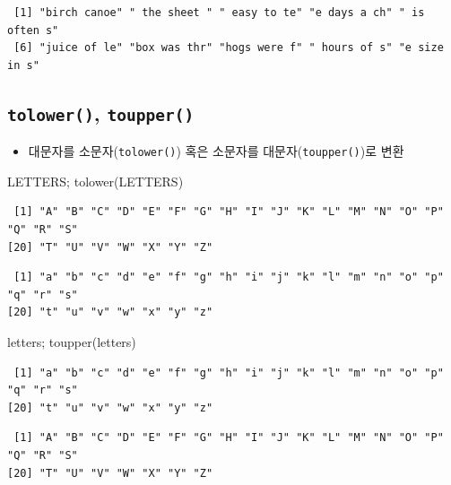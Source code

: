 \documentclass[
  11pt,
]{krantz}
\newenvironment{Shaded}{\begin{snugshade}}{\end{snugshade}}
\newcommand{\FunctionTok}[1]{\textcolor[rgb]{0,0,0}{#1}}
\newcommand{\NormalTok}[1]{#1}
\providecommand{\tightlist}{%
  \setlength{\itemsep}{0pt}\setlength{\parskip}{0pt}}
\begin{document}
\begin{verbatim}
 [1] "birch canoe" " the sheet " " easy to te" "e days a ch" " is often s"
 [6] "juice of le" "box was thr" "hogs were f" " hours of s" "e size in s"
\end{verbatim}

\normalsize

\hypertarget{low-up-fun}{%
\subsection{\texorpdfstring{\textbf{\texttt{tolower()}, \texttt{toupper()}}}{tolower(), toupper()}}\label{low-up-fun}}

\begin{itemize}
\tightlist
\item
  대문자를 소문자(\texttt{tolower()}) 혹은 소문자를 대문자(\texttt{toupper()})로 변환
\end{itemize}

\footnotesize

\begin{Shaded}
\begin{Highlighting}[]
\NormalTok{LETTERS; }\FunctionTok{tolower}\NormalTok{(LETTERS)}
\end{Highlighting}
\end{Shaded}

\begin{verbatim}
 [1] "A" "B" "C" "D" "E" "F" "G" "H" "I" "J" "K" "L" "M" "N" "O" "P" "Q" "R" "S"
[20] "T" "U" "V" "W" "X" "Y" "Z"
\end{verbatim}

\begin{verbatim}
 [1] "a" "b" "c" "d" "e" "f" "g" "h" "i" "j" "k" "l" "m" "n" "o" "p" "q" "r" "s"
[20] "t" "u" "v" "w" "x" "y" "z"
\end{verbatim}

\begin{Shaded}
\begin{Highlighting}[]
\NormalTok{letters; }\FunctionTok{toupper}\NormalTok{(letters)}
\end{Highlighting}
\end{Shaded}

\begin{verbatim}
 [1] "a" "b" "c" "d" "e" "f" "g" "h" "i" "j" "k" "l" "m" "n" "o" "p" "q" "r" "s"
[20] "t" "u" "v" "w" "x" "y" "z"
\end{verbatim}

\begin{verbatim}
 [1] "A" "B" "C" "D" "E" "F" "G" "H" "I" "J" "K" "L" "M" "N" "O" "P" "Q" "R" "S"
[20] "T" "U" "V" "W" "X" "Y" "Z"
\end{verbatim}
\end{document}
